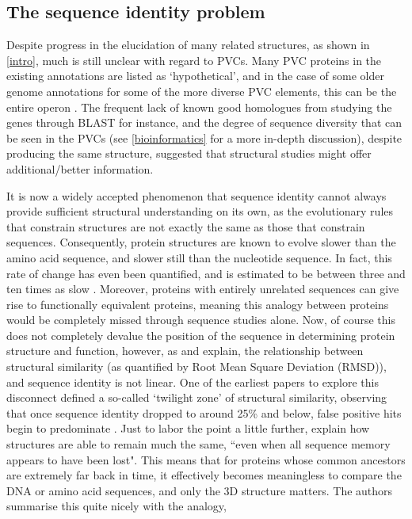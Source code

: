 \subsection{The sequence identity problem}
Despite progress in the elucidation of many related structures, as shown in \vref{intro}, much is still unclear with regard to PVCs. Many PVC proteins in the existing \Pa{} annotations are listed as `hypothetical', and in the case of some older genome annotations for some of the more diverse PVC elements, this can be the entire operon \citep{Duchaud2003}. The frequent lack of known good homologues from studying the genes through BLAST for instance, and the degree of sequence diversity that can be seen in the PVCs (see \vref{bioinformatics} for a more in-depth discussion), despite producing the same structure, suggested that structural studies might offer additional/better information.

It is now a widely accepted phenomenon that sequence identity cannot always provide sufficient structural understanding on its own, as the evolutionary rules that constrain structures are not exactly the same as those that constrain sequences. Consequently, protein structures are known to evolve slower than the amino acid sequence, and slower still than the nucleotide sequence. In fact, this rate of change has even been quantified, and is estimated to be between three and ten times as slow \citep{Illergard2009}. Moreover, proteins with entirely unrelated sequences can give rise to functionally equivalent proteins, meaning this analogy between proteins would be completely missed through sequence studies alone. Now, of course this does not completely devalue the position of the sequence in determining protein structure and function, however, as \cite{Illergard2009} and \cite{Chothia1986} explain, the relationship between structural similarity (as quantified by Root Mean Square Deviation (RMSD)), and sequence identity is not linear. One of the earliest papers to explore this disconnect defined a so-called `twilight zone' of structural similarity, observing that once sequence identity dropped to around 25\% and below, false positive hits begin to predominate \citep{rost1999twilight}. Just to labor the point a little further, \cite{Holm1996} explain how structures are able to remain much the same, ``even when all sequence memory appears
to have been lost". This means that for proteins whose common ancestors are extremely far back in time, it effectively becomes meaningless to compare the DNA or amino acid sequences, and only the 3D structure matters. The authors summarise this quite nicely with the analogy, 

